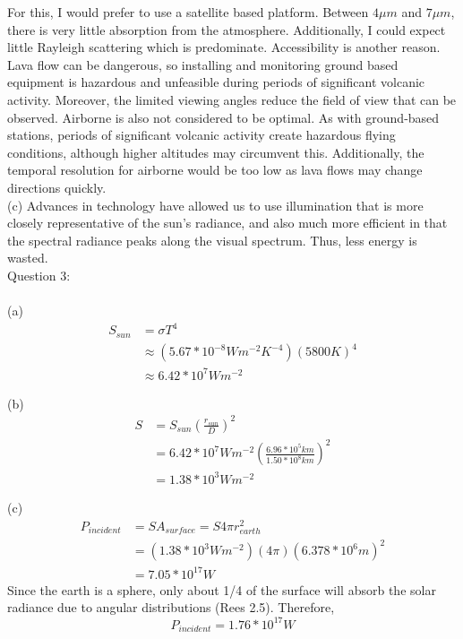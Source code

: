 \documentclass{homework}
\begin{document}
For this, I would prefer to use a satellite based platform. Between $4 \mu m$ and $7 \mu m$, there is very little absorption from the atmosphere. Additionally, I could expect little Rayleigh scattering which is predominate. Accessibility is another reason. Lava flow can be dangerous, so installing and monitoring ground based equipment is hazardous and unfeasible during periods of significant volcanic activity. Moreover, the limited viewing angles reduce the field of view that can be observed. Airborne is also not considered to be optimal. As with ground-based stations, periods of significant volcanic activity create hazardous flying conditions, although higher altitudes may circumvent this. Additionally, the temporal resolution for airborne would be too low as lava flows may change directions quickly. \\

(c)
Advances in technology have allowed us to use illumination that is more closely representative of the sun's radiance, and also much more efficient in that the spectral radiance peaks along the visual spectrum. Thus, less energy is wasted. \\


Question 3: \\ \\
(a) 
\begin{equation*}
    \begin{split}
        S_{sun} 
        & = \sigma T^4 \\
        & \approx (5.67*10^{-8}Wm^{-2}K^{-4})(5800K)^4 \\
        & \approx 6.42*10^{7}Wm^{-2}
    \end{split}
\end{equation*}
    
    
(b)
\begin{equation*}
    \begin{split}
        S 
        & = S_{sun}(\frac{r_{sun}}{D})^2 \\
        & = 6.42*10^7 Wm^{-2}(\frac{6.96*10^5 km}{1.50*10^8 km})^2 \\
        & = 1.38*10^3 Wm^{-2}
    \end{split}
\end{equation*}
    
(c)
\begin{equation*}
    \begin{split}
        P_{incident} 
        & = SA_{surface} = S4 \pi r^2_{earth} \\
        & = (1.38*10^3 Wm^{-2})(4 \pi)(6.378*10^6 m)^2 \\
        & = 7.05*10^{17} W 
    \end{split}
\end{equation*}
Since the earth is a sphere, only about 1/4 of the surface will absorb the solar radiance due to angular distributions (Rees 2.5). Therefore, 
\begin{equation*}
    P_{incident} = 1.76*10^{17} W
\end{equation*}
\end{document}
